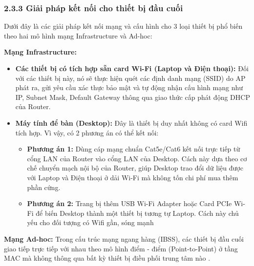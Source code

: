 \subsubsection{2.3.3 Giải pháp kết nối cho thiết bị đầu cuối}
Dưới đây là các giải pháp kết nối mạng và cấu hình cho 3 loại thiết bị phổ biến theo hai mô hình mạng Infrastructure và Ad-hoc:

\textbf{Mạng Infrastructure:}
\begin{itemize}
    \item \textbf{Các thiết bị có tích hợp sẵn card Wi-Fi (Laptop và Điện thoại):}
    Đối với các thiết bị này, nó sẽ thực hiện quét các định danh mạng (SSID) do AP phát ra, gửi yêu cầu xác thực bảo mật và tự động nhận cấu hình mạng như IP, Subnet Mask, Default Gateway thông qua giao thức cấp phát động
    DHCP của Router.
    \item \textbf{Máy tính để bàn (Desktop):}
    Đây là thiết bị duy nhất không có card Wifi tích hợp. Vì vậy, có 2 phương án có thể kết nối:
    \begin{itemize}
        \item \textbf{Phương án 1:}
        Dùng cáp mạng chuẩn Cat5e/Cat6 kết nối trực tiếp từ cổng LAN
        của Router vào cổng LAN của Desktop. Cách này dựa theo cơ chế
        chuyển mạch nội bộ của Router, giúp Desktop trao đổi dữ liệu được
        với Laptop và Điện thoại ở dải Wi-Fi mà không tốn chi phí mua thêm
        phần cứng.
        \item \textbf{Phương án 2:}
        Trang bị thêm USB Wi-Fi Adapter hoặc Card PCIe Wi-Fi để biến
        Desktop thành một thiết bị tương tự Laptop. Cách này chủ yếu cho đối tượng có Wifi gần, sóng mạnh
    \end{itemize}
\end{itemize}


\textbf{Mạng Ad-hoc:}
Trong cấu trúc mạng ngang hàng (IBSS), các thiết bị đầu cuối giao tiếp trực tiếp với nhau theo mô hình điểm - điểm (Point-to-Point) ở tầng MAC mà không thông qua bất kỳ thiết bị điều phối trung tâm nào \cite{ieee80211}.

